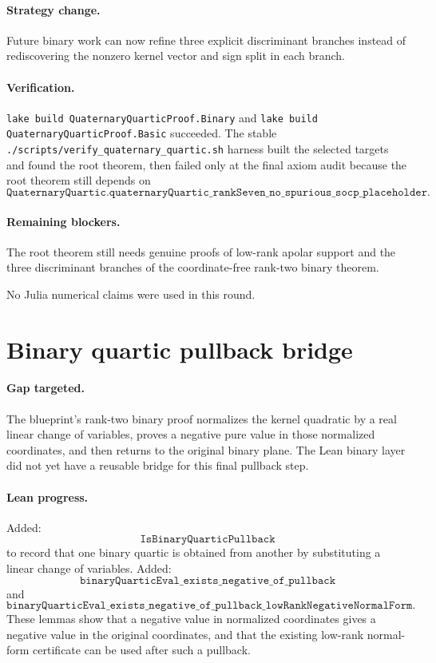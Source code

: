 \documentclass[11pt]{article}
\begin{document}
\paragraph{Strategy change.}
Future binary work can now refine three explicit discriminant branches instead
of rediscovering the nonzero kernel vector and sign split in each branch.

\paragraph{Verification.}
\texttt{lake build QuaternaryQuarticProof.Binary} and
\texttt{lake build QuaternaryQuarticProof.Basic} succeeded.  The stable
\texttt{./scripts/verify\_quaternary\_quartic.sh} harness built the selected
targets and found the root theorem, then failed only at the final axiom audit
because the root theorem still depends on
\[
\texttt{QuaternaryQuartic.quaternaryQuartic\_rankSeven\_no\_spurious\_socp\_placeholder}.
\]

\paragraph{Remaining blockers.}
The root theorem still needs genuine proofs of low-rank apolar support and the
three discriminant branches of the coordinate-free rank-two binary theorem.

No Julia numerical claims were used in this round.

\section*{Binary quartic pullback bridge}

\paragraph{Gap targeted.}
The blueprint's rank-two binary proof normalizes the kernel quadratic by a real
linear change of variables, proves a negative pure value in those normalized
coordinates, and then returns to the original binary plane.  The Lean binary
layer did not yet have a reusable bridge for this final pullback step.

\paragraph{Lean progress.}
Added:
\[
\texttt{IsBinaryQuarticPullback}
\]
to record that one binary quartic is obtained from another by substituting a
linear change of variables.  Added:
\[
\texttt{binaryQuarticEval\_exists\_negative\_of\_pullback}
\]
and
\[
\texttt{binaryQuarticEval\_exists\_negative\_of\_pullback\_lowRankNegativeNormalForm}.
\]
These lemmas show that a negative value in normalized coordinates gives a
negative value in the original coordinates, and that the existing low-rank
normal-form certificate can be used after such a pullback.
\end{document}
